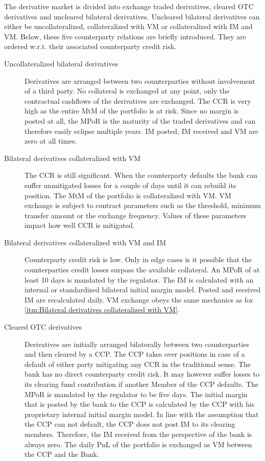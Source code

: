 \documentclass[../Thesis_AHoecherl.tex]{subfiles}
\begin{document}
The derivative market is divided into exchange traded derivatives, cleared OTC derivatives and uncleared bilateral derivatives. Uncleared bilateral derivatives can either be uncollateralized, collateralized with \gls{VM} or collateralized with \gls{IM} and \gls{VM}. Below, these five counterparty relations are briefly introduced. They are ordered w.r.t. their associated counterparty credit risk.

\begin{description}
    \item[Uncollateralized bilateral derivatives\label{itm:Uncollateralized bilateral derivatives}] 
    Derivatives are arranged between two counterparties without involvement of a third party. No collateral is exchanged at any point, only the contractual cashflows of the derivatives are exchanged. The \gls{CCR} is very high as the entire \gls{MtM} of the portfolio is at risk. Since no margin is posted at all, the \gls{MPoR} is the maturity of the traded derivatives and can therefore easily eclipse multiple years. \gls{IM} posted, \gls{IM} received and \gls{VM} are zero at all times.
    \item[Bilateral derivatives collateralized with VM\label{itm:Bilateral derivatives collateralized with VM}] 
    The \gls{CCR} is still significant. When the counterparty defaults the bank can suffer unmitigated losses for a couple of days until it can rebuild its position. The \gls{MtM} of the portfolio is collateralized with \gls{VM}. \gls{VM} exchange is subject to contract parameters such as the threshold, minimum transfer amount or the exchange frequency. Values of these parameters impact how well \gls{CCR} is mitigated.
    \item[Bilateral derivatives collateralized with \gls{VM} and \gls{IM}\label{itm:Bilateral derivatives collateralized with VM and IM}] 
    Counterparty credit risk is low. Only in edge cases is it possible that the counterparties credit losses surpass the available collateral. An \gls{MPoR} of at least 10 days is mandated by the regulator. The IM is calculated with an internal or standardized bilateral initial margin model. Posted and received IM are recalculated daily. \gls{VM} exchange obeys the same mechanics as for \ref{itm:Bilateral derivatives collateralized with VM}.
    \item[Cleared OTC derivatives\label{itm:Cleared OTC derivatives}] 
    Derivatives are initially arranged bilaterally between two counterparties and then cleared by a CCP. The CCP takes over positions in case of a default of either party mitigating any \gls{CCR} in the traditional sense. The bank has no direct counterparty credit risk. It may however suffer losses to its clearing fund contribution if another Member of the CCP defaults. The \gls{MPoR} is mandated by the regulator to be five days. The initial margin that is posted by the bank to the \gls{CCP} is calculated by the \gls{CCP} with his proprietary internal initial margin model. In line with the assumption that the CCP can not default, the CCP does not post IM to its clearing members. Therefore, the IM received from the perspective of the bank is always zero. The daily \gls{PnL} of the portfolio is exchanged as VM between the CCP and the Bank. 

\end{description}
\end{document}
